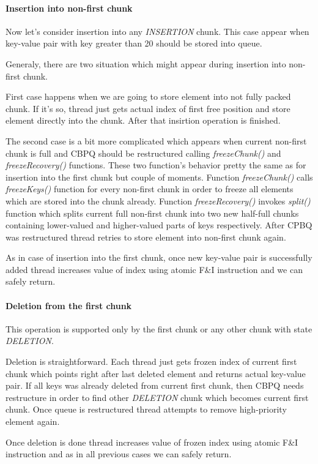 \documentclass{article}
\begin{document}
\paragraph{Insertion into non-first chunk}\mbox{}\par
Now let's consider insertion into any \emph{INSERTION} chunk. This case appear when key-value pair with key greater than 20 should be stored into queue.\par
Generaly, there are two situation which might appear during insertion into non-first chunk.\par
First case happens when we are going to store element into not fully packed chunk. If it's so, thread just gets actual index of first free position and store element directly into the chunk. After that insirtion operation is finished.\par
The second case is a bit more complicated which appears when current non-first chunk is full and CBPQ should be restructured calling \textit{freezeChunk()} and \textit{freezeRecovery()} functions. These two function's behavior pretty the same as for insertion into the first chunk but couple of moments. Function \textit{freezeChunk()} calls \textit{freezeKeys()} function for every non-first chunk in order to freeze all elements which are stored into the chunk already. Function \textit{freezeRecovery()} invokes \textit{split()} function which splits current full non-first chunk into two new half-full chunks containing lower-valued and higher-valued parts of keys respectively. After CPBQ was restructured thread retries to store element into non-first chunk again.\par
As in case of insertion into the first chunk, once new key-value pair is successfully added thread increases value of index using atomic F\&I instruction and we can safely return.

\paragraph{Deletion from the first chunk}\mbox{}\par
This operation is supported only by the first chunk or any other chunk with state \emph{DELETION}.\par
Deletion is straightforward. Each thread just gets frozen index of current first chunk which points right after last deleted element and returns actual key-value pair. If all keys was already deleted from current first chunk, then CBPQ needs restructure in order to find other \emph{DELETION} chunk which becomes current first chunk. Once queue is restructured thread attempts to remove high-priority element again.\par
Once deletion is done thread increases value of frozen index using atomic F\&I instruction and as in all previous cases we can safely return.
\end{document}
